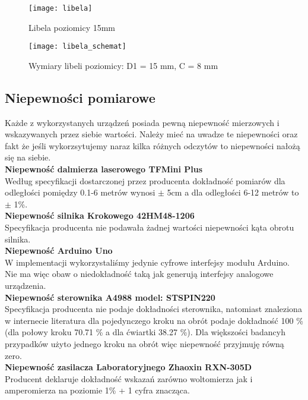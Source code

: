 \begin{figure}[h]
    \centering
    \texttt{[image: libela]}
    \caption{Libela poziomicy 15mm}
    \label{fig:libela}
\end{figure}

\begin{figure}[h]
    \centering
    \texttt{[image: libela\_schemat]}
    \caption{Wymiary libeli poziomicy: D1 = 15 mm, C = 8 mm}
    \label{fig:libela_schemat}
\end{figure} 

\subsection {Niepewności pomiarowe}
Każde z wykorzystanych urządzeń posiada pewną niepewność mierzowych i wskazywanych przez siebie wartości. Należy mieć na uwadze te niepewności oraz fakt że jeśli wykorzsytujemy naraz kilka różnych odczytów to niepewności nałożą się na siebie.\\

\textbf{Niepewność dalmierza laserowego TFMini Plus}\\
Według specyfikacji dostarczonej przez producenta dokładność pomiarów dla odległości pomiędzy 0.1-6 metrów wynosi $\pm$ 5cm a dla odległości 6-12 metrów to $\pm$ 1\%.\\

\textbf{Niepewność silnika Krokowego 42HM48-1206}\\
Specyfikacja producenta nie podawała żadnej wartości niepewności kąta obrotu silnika.\\

\textbf{Niepewność Arduino Uno}\\
W implementacji wykorzystaliśmy jedynie cyfrowe interfejsy modułu Arduino. Nie ma więc obaw o niedokładność taką jak generują interfejsy analogowe urządzenia.\\

\textbf{Niepewność sterownika A4988 model: STSPIN220}\\
Specyfikacja producenta nie podaje dokładności sterownika, natomiast znaleziona w internecie literatura \cite{microstepping} dla pojedynczego kroku na obrót podaje dokładność 100 \% (dla połowy kroku 70.71 \% a dla ćwiartki 38.27 \%). Dla większości badancyh przypadków użyto jednego kroku na obrót więc niepewność przyjmuję równą zero.\\

\textbf{Niepewność zasilacza Laboratoryjnego Zhaoxin RXN-305D}\\
Producent deklaruje dokładność wskazań zarówno woltomierza jak i amperomierza na poziomie 1\% + 1 cyfra znacząca.\\

